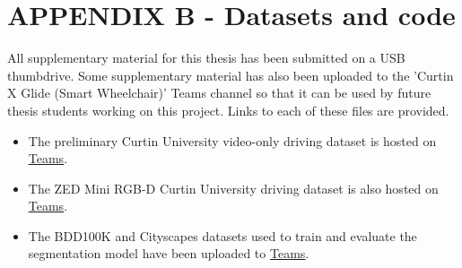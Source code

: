 \section*{APPENDIX B - Datasets and code}


All supplementary material for this thesis has been submitted on a USB thumbdrive.
Some supplementary material has also been uploaded to the 'Curtin X Glide (Smart Wheelchair)' Teams channel so that it can be used by future thesis students
working on this project. Links to each of these files are provided.
\begin{itemize}
    \item The preliminary Curtin University video-only driving dataset is hosted on \href{https://curtin.sharepoint.com/:v:/r/sites/CurtinXGlide/Shared%20Documents/Navigation%20and%20Object%20Detection/GoPro%20Dataset.mp4?csf=1&web=1&e=seLdRb}{\underline{Teams}}.
    \item The ZED Mini RGB-D Curtin University driving dataset is also hosted on \href{https://curtin.sharepoint.com/:f:/r/sites/CurtinXGlide/Shared%20Documents/Navigation%20and%20Object%20Detection/ZED?csf=1&web=1&e=tTau9D}{\underline{Teams}}.
    \item The BDD100K and Cityscapes datasets used to train and evaluate the segmentation model have been uploaded to \href{https://curtin.sharepoint.com/:f:/r/sites/CurtinXGlide/Shared%20Documents/Navigation%20and%20Object%20Detection/External%20Datasets?csf=1&web=1&e=qjWuoP}{\underline{Teams}}.
\end{itemize}


